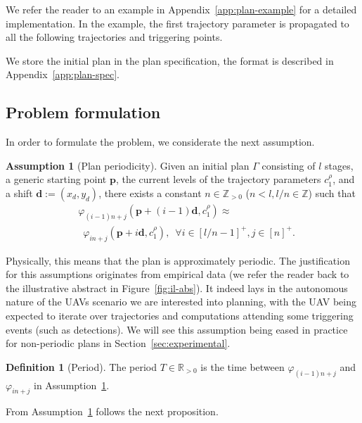 \documentclass[letterpaper,10pt,conference]{ieeeconf}
\theoremstyle{definition}
\newtheorem{assm}[thm]{Assumption}
\newtheorem{defn}{Definition}[section]
\begin{document}
We refer the reader to an example in Appendix~\ref{app:plan-example} for a detailed implementation. In the example, the first trajectory parameter is propagated to all the following trajectories and triggering points. 

We store the initial plan in the plan specification, the format is described in Appendix~\ref{app:plan-spec}. 

\subsection{Problem formulation}

In order to formulate the problem, we considerate the next assumption.

\begin{assm}[Plan periodicity]\label{assm:periodic}
  Given an initial plan $\Gamma$ consisting of $l$ stages, a generic starting point $\mathbf{p}$, the current levels of the trajectory parameters $c_1^\rho$, and a shift $\mathbf{d}:=(x_d,y_d)$, there exists a constant $n\in\mathbb{Z}_{>0}$ ($n<l,l/n\in\mathbb{Z}$) such that
  \begin{equation*}\begin{split}
    &\varphi_{(i-1)n+j}(\mathbf{p}+(i-1)\mathbf{d},c_1^\rho)\approx\\ &\,\,\,\varphi_{in+j}(\mathbf{p}+i\mathbf{d},c_1^\rho),\,\,\,\forall i\in[l/n-1]^+,j\in[n]^+.
  \end{split}\end{equation*}
\end{assm}

Physically, this means that the plan is approximately periodic. The justification for this assumptions originates from empirical data (we refer the reader back to the illustrative abstract in Figure~\ref{fig:il-abs}). It indeed lays in the autonomous nature of the UAVs scenario we are interested into planning, with the UAV being expected to iterate over trajectories and computations attending some triggering events (such as detections). We will see this assumption being eased in practice for non-periodic plans in Section~\ref{sec:experimental}.

\begin{defn}[Period]\label{def:period}
  The period $T\in\mathbb{R}_{> 0}$ is the time between $\varphi_{(i-1)n+j}$ and $\varphi_{in+j}$ in Assumption~\ref{assm:periodic}.
\end{defn} 

From Assumption~\ref{assm:periodic} follows the next proposition.
\end{document}
